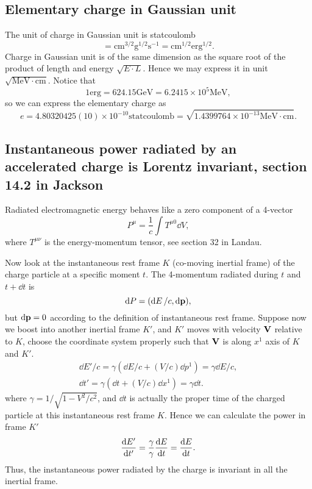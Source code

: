 \documentclass[10pt]{article}
\begin{document}
\subsection{Elementary charge in Gaussian unit}
The unit of charge in Gaussian unit is statcoulomb
\begin{equation}
	[charge] = \mathrm{cm}^{3/2} \mathrm{g}^{1/2} \mathrm{s}^{-1} = \mathrm{cm}^{1/2} \mathrm{erg}^{1/2}.
\end{equation}
Charge in Gaussian unit is of the same dimension as the square root of the product of length and energy $\sqrt{E \cdot L}$. Hence we may express it in unit $\sqrt{\mathrm{MeV} \cdot \mathrm{cm}}$. Notice that
\begin{equation}
	1 \mathrm{erg} = 624.15 \mathrm{GeV} = 6.2415 \times 10^{5} \mathrm{MeV},
\end{equation}
so we can express the elementary charge as
\begin{equation}
	e = 4.80320425(10)\times10^{-10} \mathrm{statcoulomb} = \sqrt{1.4399764 \times 10^{-13} \mathrm{MeV} \cdot \mathrm{cm}}.
\end{equation}

\subsection{Instantaneous power radiated by an accelerated charge is Lorentz invariant, section 14.2 in Jackson}
Radiated electromagnetic energy behaves like a zero component of a 4-vector
\begin{equation}
	P^{\mu} = \frac{1}{c} \int T^{\mu 0} \dd{V},
\end{equation}
where $T^{\mu \nu}$ is the energy-momentum tensor, see section 32 in Landau.

Now look at the instantaneous rest frame $K$ (co-moving inertial frame) of the charge particle at a specific moment $t$. The 4-momentum radiated during $t$ and $t + \dd{t}$ is
\begin{equation}
	\dd{P} = (\dd{E}/c, \dd{\vb{p}}),
\end{equation}
but $\dd{\vb{p}} = 0$ according to the definition of instantaneous rest frame. Suppose now we boost into another inertial frame $K'$, and $K'$ moves with velocity $\vb{V}$ relative to $K$, choose the coordinate system properly such that $\vb{V}$ is along $x^1$ axis of $K$ and $K'$.
\begin{gather}
	\dd{E'}/c = \gamma (\dd{E}/c + (V/c) \dd{p}^1) = \gamma \dd{E}/c, \\
	\dd{t'} = \gamma (\dd{t} + (V/c) \dd{x}^1) = \gamma \dd{t}.
\end{gather}
where $\gamma = 1/\sqrt{1-V^2/c^2}$, and $\dd{t}$ is actually the proper time of the charged particle at this instantaneous rest frame $K$. Hence we can calculate the power in frame $K'$
\begin{equation}
	\dv{E'}{t'} = \frac{\gamma}{\gamma} \dv{E}{t} = \dv{E}{t}.
\end{equation}
Thus, the instantaneous power radiated by the charge is invariant in all the inertial frame.
\end{document}
